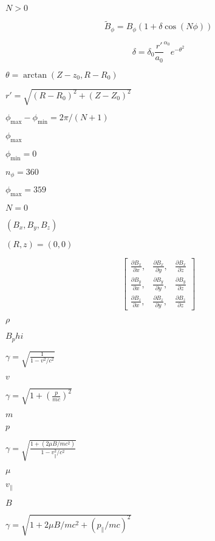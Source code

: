 \documentclass{article}
\begin{document}
$N>0$
\pagebreak

\begin{equation*} \tilde{B}_\phi = B_\phi( 1 + \delta\cos(N\phi) ) \end{equation*}
\pagebreak

\begin{equation*} \delta = \delta_0 \frac{r'}{a_0}^{\alpha_0} e^{-\theta^2} \end{equation*}
\pagebreak

$\theta = \arctan(Z - z_0, R- R_0)$
\pagebreak

$r' = \sqrt{(R-R_0)^2 + (Z-Z_0)^2}$
\pagebreak

$\phi_\mathrm{max}-\phi_\mathrm{min} = 2\pi/(N+1)$
\pagebreak

$\phi_\mathrm{max}$
\pagebreak

$\phi_\mathrm{min}=0$
\pagebreak

$n_\phi = 360$
\pagebreak

$\phi_\mathrm{max}=359$
\pagebreak

$N=0$
\pagebreak

$(B_x, B_y, B_z)$
\pagebreak

$(R,z) = (0,0)$
\pagebreak

\[ \begin{bmatrix} \frac{\partial B_x}{\partial x}, &\frac{\partial B_x}{\partial y}, &\frac{\partial B_x}{\partial z} \\ \frac{\partial B_y}{\partial x}, &\frac{\partial B_y}{\partial y}, &\frac{\partial B_y}{\partial z} \\ \frac{\partial B_z}{\partial x}, &\frac{\partial B_z}{\partial y}, &\frac{\partial B_z}{\partial z} \end{bmatrix} \]
\pagebreak

$\rho$
\pagebreak

$B_phi$
\pagebreak

$ \gamma = \sqrt{\frac{1}{1-v^2/c^2}}$
\pagebreak

$v$
\pagebreak

$\gamma = \sqrt{1 + \left(\frac{p}{mc}\right)^2}$
\pagebreak

$m$
\pagebreak

$p$
\pagebreak

$\gamma = \sqrt{\frac{1 + (2\mu B/mc^2)}{1 - v_\parallel^2/c^2}}$
\pagebreak

$\mu$
\pagebreak

$v_\parallel$
\pagebreak

$B$
\pagebreak

$\gamma = \sqrt{1 + 2\mu B/mc^2 + (p_\parallel/mc)^2}$
\pagebreak
\end{document}

